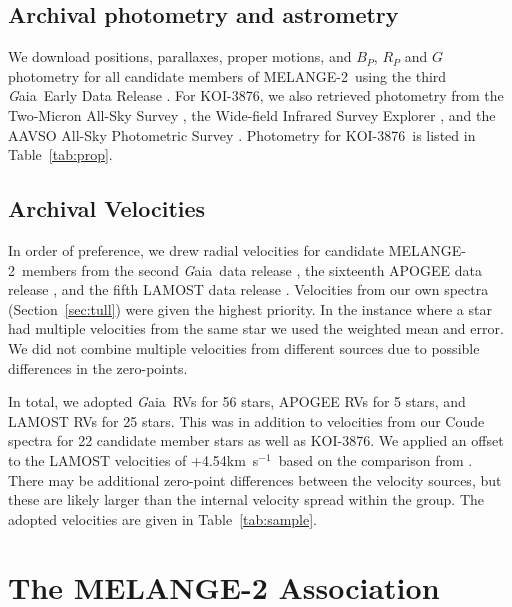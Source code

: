 \documentclass[twocolumn]{aastex631}
\newcommand{\starname}{KOI-3876}
\newcommand\kms{km~s$^{-1}$}
\newcommand{\gaia}{{\textit Gaia}}
\newcommand{\association}{MELANGE-2}
\begin{document}
\subsection{Archival photometry and astrometry}
We download positions, parallaxes, proper motions, and $B_P$, $R_P$ and $G$ photometry for all candidate members of \association\ using the third \gaia\ Early Data Release \citep[EDR3;][]{GaiaEDR3}. For \starname, we also retrieved photometry from the Two-Micron All-Sky Survey \citep[2MASS;][]{Skrutskie2006}, the Wide-field Infrared Survey Explorer \citep[WISE; ][]{allwise}, and the AAVSO All-Sky Photometric Survey \citep[APASS; ][]{apass}. Photometry for \starname\ is listed in Table~\ref{tab:prop}. 


\subsection{Archival Velocities}
In order of preference, we drew radial velocities for candidate \association\ members from the second \gaia\ data release \citep[DR2;][]{DR2_velocities}, the sixteenth APOGEE data release \citep[DR16; ][]{2020AJ....160..120J}, and the fifth LAMOST data release \cite[DR5; ][]{2015RAA....15.1095L, 2019yCat.5164....0L}. Velocities from our own spectra (Section~\ref{sec:tull}) were given the highest priority. In the instance where a star had multiple velocities from the same star we used the weighted mean and error. We did not combine multiple velocities from different sources due to possible differences in the zero-points. 


In total, we adopted \gaia\ RVs for 56 stars, APOGEE RVs for 5 stars, and LAMOST RVs for 25 stars. This was in addition to velocities from our Coude spectra for 22 candidate member stars as well as \starname. We applied an offset to the LAMOST velocities of +4.54\kms\ based on the comparison from \citet{2018A&A...620A..76A}. There may be additional zero-point differences between the velocity sources, but these are likely larger than the internal velocity spread within the group. The adopted velocities are given in Table~\ref{tab:sample}.

\section{The MELANGE-2 Association}\label{sec:cluster}
\end{document}
